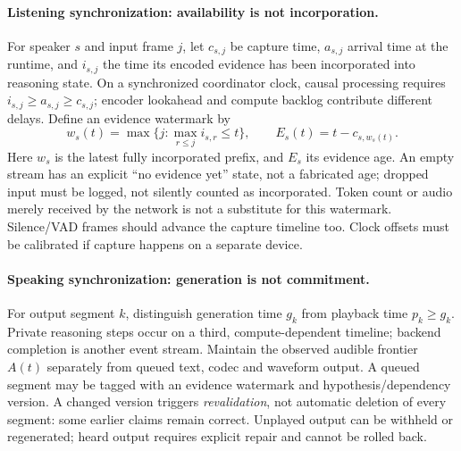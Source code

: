 \documentclass{article}
\begin{document}
\paragraph{Listening synchronization: availability is not incorporation.}
For speaker $s$ and input frame $j$, let $c_{s,j}$ be capture time, $a_{s,j}$ arrival time at the runtime, and $i_{s,j}$ the time its encoded evidence has been incorporated into reasoning state. On a synchronized coordinator clock, causal processing requires $i_{s,j}\geq a_{s,j}\geq c_{s,j}$; encoder lookahead and compute backlog contribute different delays. Define an evidence watermark by
\begin{equation}
\label{eq:watermark}
w_s(t)=\max\{j:\max_{r\leq j}i_{s,r}\leq t\},\qquad E_s(t)=t-c_{s,w_s(t)}.
\end{equation}
Here $w_s$ is the latest fully incorporated prefix, and $E_s$ its evidence age. An empty stream has an explicit ``no evidence yet'' state, not a fabricated age; dropped input must be logged, not silently counted as incorporated. Token count or audio merely received by the network is not a substitute for this watermark. Silence/VAD frames should advance the capture timeline too. Clock offsets must be calibrated if capture happens on a separate device.

\paragraph{Speaking synchronization: generation is not commitment.}
For output segment $k$, distinguish generation time $g_k$ from playback time $p_k\geq g_k$. Private reasoning steps occur on a third, compute-dependent timeline; backend completion is another event stream. Maintain the observed audible frontier $A(t)$ separately from queued text, codec and waveform output. A queued segment may be tagged with an evidence watermark and hypothesis/dependency version. A changed version triggers \emph{revalidation}, not automatic deletion of every segment: some earlier claims remain correct. Unplayed output can be withheld or regenerated; heard output requires explicit repair and cannot be rolled back.
\end{document}
